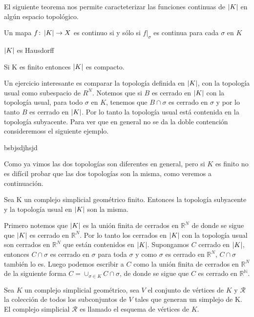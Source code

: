 El siguiente teorema nos permite caracteterizar las funciones continuas de $\left| K \right|$ en algún espacio topológico.
\begin{Teo}\label{ttc}
Un mapa $f\colon \left| K \right|\rightarrow X$ es continuo si y sólo si $f|_{\sigma}$ es continua para cada $\sigma$ en $K$
\end{Teo}
\begin{Teo}
$\left| K \right|$ es Hausdorff
\end{Teo}
\begin{Teo}
Si K es finito entonces $\left| K \right|$ es compacto.
\end{Teo}
Un ejercicio interesante es comparar la topología definida en $\left| K \right|$, con la topología usual como subespacio de $R^{N}$. Notemos que si $B$ es cerrado en $\left| K \right|$ con la topología usual, para todo $\sigma$ en $K$, tenemos que $B\cap\sigma$ es cerrado en $\sigma$ y por lo tanto $B$ es cerrado en $\left| K \right|$. Por lo tanto la topología usual está contenida en la topología subyacente. Para ver que en general no se da la doble contención consideremoss el siguiente ejemplo.
\begin{Ejem}
bsbjsdjhsjd
\end{Ejem}
Como ya vimos las dos topologías son diferentes en general, pero si $K$ es finito no es difícil probar que las dos topologías son la misma, como veremos a continuación.
\begin{Prop}
Sea K un complejo simplicial geométrico finito. Entonces la topología subyacente y la topología usual en $\left| K \right|$ son la misma.
\end{Prop}
\begin{Dem}

Primero notemos que $\left| K \right|$ es la unión finita de cerrados en $\mathbb{R}^N$ de donde se sigue que $\left| K \right|$ es cerrado en $\mathbb{R}^N$. Por lo tanto los cerrados en $\left| K \right|$ con la topología usual son cerrados en $\mathbb{R}^N$ que están contenidos en $\left| K \right|$.
Supongamos $C$ cerrado en $\left| K \right|$, entonces $C\cap\sigma$ es cerrado en $\sigma$ para toda $\sigma$ y como $\sigma$ es cerrado en $\mathbb{R}^N$, $C\cap\sigma$ también lo es. Luego podemos escribir a $C$ como la unión finita de cerrados en  $\mathbb{R}^N$ de la siguiente forma $C=\cup_{\sigma\in K}C\cap\sigma$, de donde se sigue que $C$ es cerrado en $\mathbb{R^N}$.
\end{Dem}
\begin{Defi}
Sea $K$ un complejo simplicial geométrico, sea $V$ el conjunto de vértices de $K$ y $\mathcal{R}$ la colección de todos los subconjuntos de $V$ tales que generan un simplejo de K. El complejo simplicial $\mathcal{R}$ es llamado el esquema de vértices de $K$.
\end{Defi}

